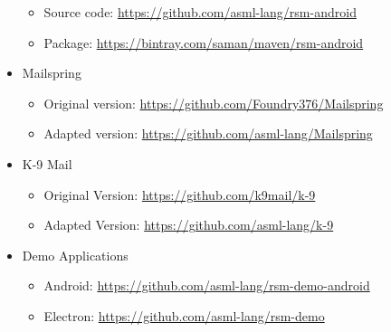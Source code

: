 \begin{itemize}
\begin{itemize}
        \item Source code: \url{https://github.com/asml-lang/rsm-android}
        \item Package: \url{https://bintray.com/saman/maven/rsm-android}
        \end{itemize}         
    \item Mailspring
        \begin{itemize}
        \item Original version: \url{https://github.com/Foundry376/Mailspring}
        \item Adapted version: \url{https://github.com/asml-lang/Mailspring}
        \end{itemize}
    \item K-9 Mail
        \begin{itemize}
        \item Original Version: \url{https://github.com/k9mail/k-9}
        \item Adapted Version: \url{https://github.com/asml-lang/k-9}
        \end{itemize}    
        
   \item Demo Applications
        \begin{itemize}
        \item Android: \url{https://github.com/asml-lang/rsm-demo-android}
        \item Electron: \url{https://github.com/asml-lang/rsm-demo}
        \end{itemize}        
        
\end{itemize}
